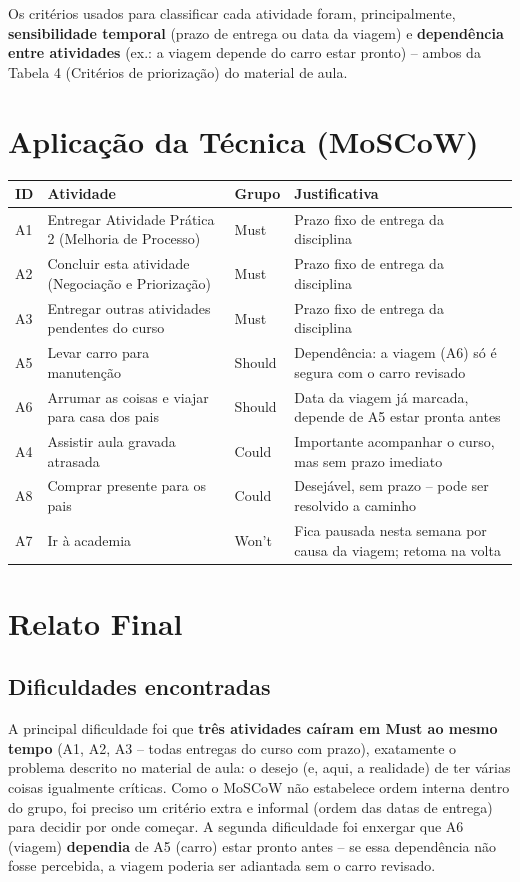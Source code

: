 \documentclass[12pt,a4paper]{article}
\begin{document}
Os critérios usados para classificar cada atividade foram, principalmente, \textbf{sensibilidade temporal} (prazo de entrega ou data da viagem) e \textbf{dependência entre atividades} (ex.: a viagem depende do carro estar pronto) -- ambos da Tabela 4 (Critérios de priorização) do material de aula.

\section{Aplicação da Técnica (MoSCoW)}
\begin{longtable}{C{1cm} L{6.3cm} C{1.8cm} L{4cm}}
\toprule
{}
\textbf{ID} & \textbf{Atividade} & \textbf{Grupo} & \textbf{Justificativa} \\
\midrule
A1 & Entregar Atividade Prática 2 (Melhoria de Processo) & Must & Prazo fixo de entrega da disciplina \\
A2 & Concluir esta atividade (Negociação e Priorização) & Must & Prazo fixo de entrega da disciplina \\
A3 & Entregar outras atividades pendentes do curso & Must & Prazo fixo de entrega da disciplina \\
A5 & Levar carro para manutenção & Should & Dependência: a viagem (A6) só é segura com o carro revisado \\
A6 & Arrumar as coisas e viajar para casa dos pais & Should & Data da viagem já marcada, depende de A5 estar pronta antes \\
A4 & Assistir aula gravada atrasada & Could & Importante acompanhar o curso, mas sem prazo imediato \\
A8 & Comprar presente para os pais & Could & Desejável, sem prazo -- pode ser resolvido a caminho \\
A7 & Ir à academia & Won't & Fica pausada nesta semana por causa da viagem; retoma na volta \\
\bottomrule
\end{longtable}

\section{Relato Final}

\subsection*{Dificuldades encontradas}
A principal dificuldade foi que \textbf{três atividades caíram em Must ao mesmo tempo} (A1, A2, A3 -- todas entregas do curso com prazo), exatamente o problema descrito no material de aula: o desejo (e, aqui, a realidade) de ter várias coisas igualmente críticas. Como o MoSCoW não estabelece ordem interna dentro do grupo, foi preciso um critério extra e informal (ordem das datas de entrega) para decidir por onde começar. A segunda dificuldade foi enxergar que A6 (viagem) \textbf{dependia} de A5 (carro) estar pronto antes -- se essa dependência não fosse percebida, a viagem poderia ser adiantada sem o carro revisado.
\end{document}

